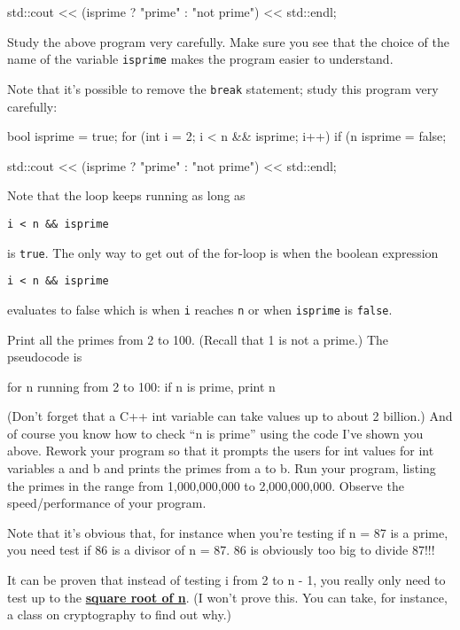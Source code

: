 \begin{console}
\begin{console}
\begin{console}
std::cout << (isprime ? "prime" : "not prime")
          << std::endl;
\end{console}
Study the above program very carefully. Make sure you see that the
choice of the name of the variable \texttt{isprime} makes the program
easier to understand.

Note that it's possible to remove the \texttt{break}
statement; study this program very carefully:
\begin{console}
bool isprime = true;
for (int i = 2; i < n && isprime; i++)
{   
    if (n %
    {
        isprime = false;
    }
}

std::cout << (isprime ? "prime" : "not prime")
          << std::endl;
\end{console}

Note that the loop keeps running as long as
\begin{center}
\texttt{i < n \&\& isprime}
\end{center}
is \texttt{true}. The only way to get out of the for-loop is when the
boolean expression
\begin{center}
\texttt{i < n \&\& isprime}
\end{center}
evaluates to false which is when \texttt{i} reaches \texttt{n} or when
\texttt{isprime} is \texttt{false}.

\begin{ex} Print all the primes from 2 to 100. (Recall that 1 is
not a prime.) The pseudocode is
\begin{console}
for n running from 2 to 100:
    if n is prime, print n
\end{console}
(Don't forget that a C++ int variable can take values up
to about 2 billion.) And of course you know how to check ``n is prime''
using the code I've shown you above. Rework your program
so that it prompts the users for int values for int variables a and b
and prints the primes from a to b. Run your program, listing the primes
in the range from 1,000,000,000 to 2,000,000,000. Observe the
speed/performance of your program.
\end{ex}
Note that it's obvious that, for instance when
you're testing if n = 87 is a prime, you need
 test if 86 is a divisor of n = 87. 86 is obviously too big
to divide 87!!!

It can be proven that instead of testing i from 2 to n - 1, you really only need to test up to the \underline{\textbf{square root of n}}. (I won't prove this. You can take, for instance, a class on cryptography to find out why.)
\end{console}
\end{console}

